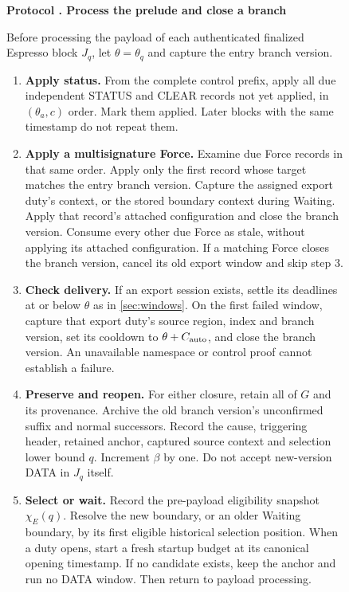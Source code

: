 \documentclass[11pt,a4paper]{article}
\newcounter{protocol}
\newenvironment{protocol}[3][htbp]{\begin{figure}[#1]\refstepcounter{protocol}\label{#2}
\begin{mdframed}[linewidth=.6pt,skipabove=0pt,skipbelow=0pt,
innertopmargin=7pt,innerbottommargin=7pt]\small
\textbf{Protocol \theprotocol. #3}\par\smallskip}{\end{mdframed}\end{figure}}
\begin{document}
\begin{protocol}{alg:force}{Process the prelude and close a branch}
Before processing the payload of each authenticated finalized Espresso
block $J_q$, let $\theta=\theta_q$ and capture the entry branch version.
\begin{enumerate}[label=\textbf{\arabic*)},itemsep=3pt]
\item \textbf{Apply status.} From the complete control prefix, apply
all due independent STATUS and CLEAR records not yet applied, in
$(\theta_a,c)$ order. Mark them applied. Later blocks with the same
timestamp do not repeat them.

\item \textbf{Apply a multisignature Force.} Examine due Force
records in that same order. Apply only the first record whose target
matches the entry branch version. Capture the assigned export duty's context,
or the stored boundary context during Waiting. Apply that record's
attached configuration and close the branch version. Consume every other due
Force as stale, without applying its attached configuration. If a
matching Force closes the branch version, cancel its old export window and
skip step 3.

\item \textbf{Check delivery.} If an export session exists, settle
its deadlines at or below $\theta$ as in \cref{sec:windows}.
On the first failed window, capture that export duty's source region,
index and branch version,
set its cooldown to $\theta+C_{\rm auto}$, and close the branch version.
An unavailable namespace or control proof cannot establish a failure.

\item \textbf{Preserve and reopen.} For either closure, retain all
of $G$ and its provenance. Archive the old branch version's unconfirmed suffix
and normal successors. Record the cause, triggering header, retained
anchor, captured source context and selection lower bound $q$.
Increment $\beta$ by one. Do not accept new-version DATA in $J_q$ itself.

\item \textbf{Select or wait.} Record the pre-payload eligibility
snapshot $\chi_E(q)$. Resolve the new boundary, or an older Waiting
boundary, by its first eligible historical selection position.
When a duty opens, start a fresh startup budget at its canonical
opening timestamp. If no candidate exists, keep the anchor and run
no DATA window. Then return to payload processing.
\end{enumerate}
\end{protocol}
\end{document}
